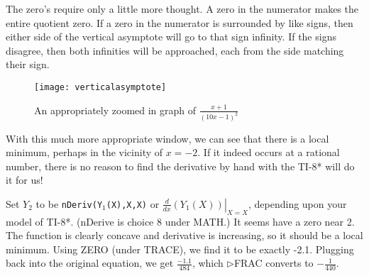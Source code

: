 The zero's require only a little more thought.  A zero in the numerator
makes the entire quotient zero.  If a zero in the numerator is surrounded by
like signs, then either side of the vertical asymptote will go to that sign infinity.
If the signs disagree, then both infinities will be approached, each from the
side matching their sign.

\begin{figure}
\begin{centering}
\texttt{[image: verticalasymptote]}
\caption{An appropriately zoomed in graph of $\frac{x+1}{(10x-1)^2}$}
\end{centering}
\end{figure}

With this much more appropriate window, we can see that there is a local minimum,
perhaps in the vicinity of $x=-2$.  If it indeed occurs at a rational number, there is no
reason to find the derivative by hand with the TI-8* will do it for us!

Set $Y_2$ to be \texttt{nDeriv(Y$_1$(X),X,X)} or $\left.\frac{d}{dx}(Y_1(X))\right|_{X=X}$, 
depending upon your model of TI-8*.  (nDerive is choice 8 under MATH.)  It seems have a
zero near 2.  The function is clearly concave and derivative is increasing, so it should be
a local minimum.  Using ZERO (under TRACE), we find it to be exactly -2.1.  Plugging
back into the original equation, we get $\frac{-1.1}{484}$, which $\triangleright$FRAC
converts to $-\frac{1}{440}$.
